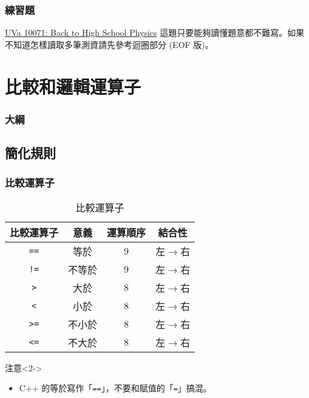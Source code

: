 \documentclass[utf8]{beamer}
\begin{document}
\begin{CJK}{UTF8}{bkai}
\begin{frame}
  \frametitle{練習題}
  \begin{exampleblock}{\href{http://unfortunate-dog.github.io/articles/100/p10071/}{UVa 10071: Back to High School Physics}}
  \label{uva:10071}
  這題只要能夠讀懂題意都不難寫。如果不知道怎樣讀取多筆測資請先參考迴圈部分 (EOF 版)。
  \end{exampleblock}
\end{frame}

\section{比較和邏輯運算子}
\begin{frame}
  \frametitle{大綱}
  \begin{multicols}{2}
    \tableofcontents[currentsection]
  \end{multicols}
\end{frame}

\subsection{簡化規則}

\begin{frame}[fragile]
  \frametitle{比較運算子}
  \begin{table}[h]
    \begin{tabular}{|c|c|c|c|}
    \hline
    比較運算子         & 意義   & 運算順序 & 結合性\\
    \hline
    \lstinline{==}{} & 等於   & 9       & 左$\rightarrow$右\\
    \hline
    \lstinline{!=}{} & 不等於 & 9       & 左$\rightarrow$右\\
    \hline
    \lstinline{>}{}  & 大於   & 8       & 左$\rightarrow$右\\
    \hline
    \lstinline{<}{}  & 小於   & 8       & 左$\rightarrow$右\\
    \hline
    \lstinline{>=}{} & 不小於 & 8       & 左$\rightarrow$右\\
    \hline
    \lstinline{<=}{} & 不大於 & 8       & 左$\rightarrow$右\\
    \hline
    \end{tabular}
    \caption{比較運算子}
  \end{table}
  \begin{alertblock}{注意}<2->
    \begin{itemize}
    \item C++ 的等於寫作「\lstinline{==}{}」，不要和賦值的「\lstinline{=}{}」搞混。
    \end{itemize}
  \end{alertblock}
\end{frame}


\end{CJK}
\end{document}
